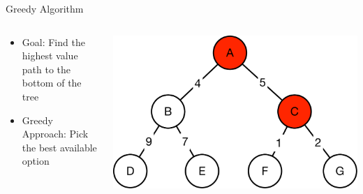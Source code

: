 \documentclass[aspectratio=169]{beamer}
\begin{document}
\begin{frame}{Greedy Algorithm}

\begin{columns}
\begin{column}{0.5\textwidth}
\begin{itemize}
\item Goal: Find the highest value path to the bottom of the tree
\item Greedy Approach: Pick the best available option
\end{itemize}
\end{column}
\begin{column}{0.5\textwidth}
\includegraphics[width=1\textwidth]{./lectUL/greedy2.pdf}
\end{column}
\end{columns}

\end{frame}
\end{document}
